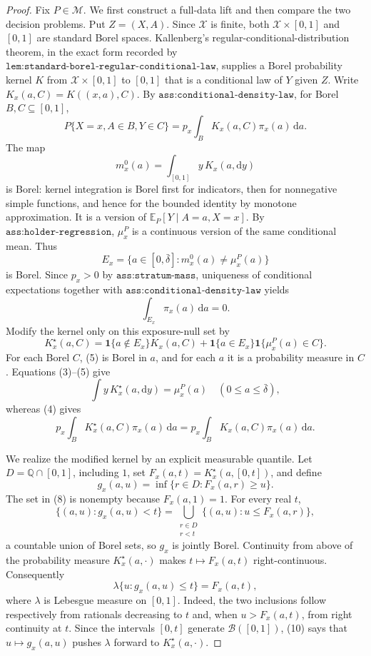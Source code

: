 \documentclass{article}
\begin{document}
\begin{proof}
Fix \(P\in\mathcal M\).  We first construct a full-data lift and then compare the two decision problems.  Put \(Z=(X,A)\).  Since \(\mathcal X\) is finite, both \(\mathcal X\times[0,1]\) and \([0,1]\) are standard Borel spaces.  Kallenberg's regular-conditional-distribution theorem, in the exact form recorded by \(\texttt{lem:standard-borel-regular-conditional-law}\), supplies a Borel probability kernel \(K\) from \(\mathcal X\times[0,1]\) to \([0,1]\) that is a conditional law of \(Y\) given \(Z\).  Write \(K_x(a,C)=K((x,a),C)\).  By \(\texttt{ass:conditional-density-law}\), for Borel \(B,C\subseteq[0,1]\),
\[
 P\{X=x,A\in B,Y\in C\}
 =p_x\int_B K_x(a,C)\pi_x(a)\,\mathrm da. \tag{1}
\]
The map
\[
 m_x^0(a)=\int_{[0,1]}y\,K_x(a,\mathrm dy) \tag{2}
\]
is Borel: kernel integration is Borel first for indicators, then for nonnegative simple functions, and hence for the bounded identity by monotone approximation.  It is a version of \(\mathbb E_P[Y\mid A=a,X=x]\).  By \(\texttt{ass:holder-regression}\), \(\mu_x^P\) is a continuous version of the same conditional mean.  Thus
\[
 E_x=\{a\in[0,\bar\delta]:m_x^0(a)\ne\mu_x^P(a)\} \tag{3}
\]
is Borel.  Since \(p_x>0\) by \(\texttt{ass:stratum-mass}\), uniqueness of conditional expectations together with \(\texttt{ass:conditional-density-law}\) yields
\[
 \int_{E_x}\pi_x(a)\,\mathrm da=0. \tag{4}
\]
Modify the kernel only on this exposure-null set by
\[
 K_x^\star(a,C)=
 \mathbf 1\{a\notin E_x\}K_x(a,C)
 +\mathbf 1\{a\in E_x\}\mathbf 1\{\mu_x^P(a)\in C\}. \tag{5}
\]
For each Borel \(C\), (5) is Borel in \(a\), and for each \(a\) it is a probability measure in \(C\).  Equations (3)--(5) give
\[
 \int y\,K_x^\star(a,\mathrm dy)=\mu_x^P(a)
 \quad(0\leq a\leq\bar\delta), \tag{6}
\]
whereas (4) gives
\[
 p_x\int_BK_x^\star(a,C)\pi_x(a)\,\mathrm da
 =p_x\int_BK_x(a,C)\pi_x(a)\,\mathrm da. \tag{7}
\]

We realize the modified kernel by an explicit measurable quantile.  Let \(D=\mathbb Q\cap[0,1]\), including \(1\), set \(F_x(a,t)=K_x^\star(a,[0,t])\), and define
\[
 g_x(a,u)=\inf\{r\in D:F_x(a,r)\geq u\}. \tag{8}
\]
The set in (8) is nonempty because \(F_x(a,1)=1\).  For every real \(t\),
\[
 \{(a,u):g_x(a,u)<t\}
 =\bigcup_{\substack{r\in D\\r<t}}
 \{(a,u):u\leq F_x(a,r)\}, \tag{9}
\]
a countable union of Borel sets, so \(g_x\) is jointly Borel.  Continuity from above of the probability measure \(K_x^\star(a,\cdot)\) makes \(t\mapsto F_x(a,t)\) right-continuous.  Consequently
\[
 \lambda\{u:g_x(a,u)\leq t\}=F_x(a,t), \tag{10}
\]
where \(\lambda\) is Lebesgue measure on \([0,1]\).  Indeed, the two inclusions follow respectively from rationals decreasing to \(t\) and, when \(u>F_x(a,t)\), from right continuity at \(t\).  Since the intervals \([0,t]\) generate \(\mathcal B([0,1])\), (10) says that \(u\mapsto g_x(a,u)\) pushes \(\lambda\) forward to \(K_x^\star(a,\cdot)\).


\end{proof}
\end{document}
